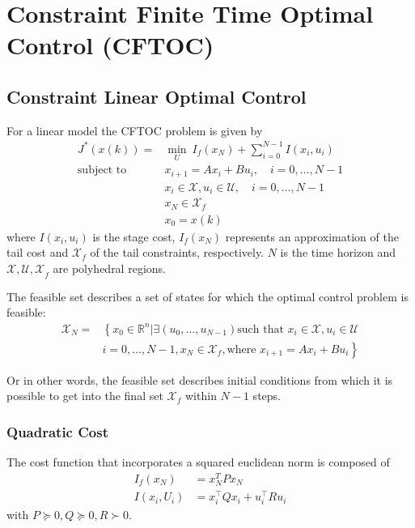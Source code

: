 \section{Constraint Finite Time Optimal Control (CFTOC)}

\subsection{Constraint Linear Optimal Control}

For a linear model the CFTOC problem is given by
\begin{align*}
    J^*(x(k)) =            & \min_U \: I_f(x_N) + \sum_{i=0}^{N-1}I(x_i,u_i)                    \\
    \text{subject to}\quad & x_{i+1} = Ax_i +Bu_i, \quad i = 0, \ldots, N-1                     \\
                           & x_i \in \mathcal{X}, u_i \in \mathcal{U}, \quad i = 0, \ldots, N-1 \\
                           & x_N \in \mathcal{X}_f                                              \\
                           & x_0 = x(k)
\end{align*}
where $I(x_i,u_i)$ is the stage cost, $I_f(x_N)$ represents an approximation of the tail cost and $\mathcal{X}_f$ of the tail constraints, respectively. $N$ is the time horizon and $\mathcal{X,U,X}_f$ are polyhedral regions.

\newpar{}

The feasible set describes a set of states for which the optimal control problem is feasible:
\begin{align*}
    \mathcal{X}_N = & \left\{ x_0 \in \mathbb{R}^n | \exists\left(u_0, \ldots, u_{N-1}\right) \text{such that } x_i\in\mathcal{X}, u_i\in\mathcal{U} \right. \\
                    & \left.i=0,\ldots, N-1, x_N\in\mathcal{X}_f, \text{where } x_{i+1}=Ax_i + Bu_i\right\}
\end{align*}

Or in other words, the feasible set describes initial conditions from which it is possible to get into the final set $\mathcal{X}_f$ within $N-1$ steps.

\subsubsection{Quadratic Cost}

The cost function that incorporates a squared euclidean norm is composed of
\begin{align*}
    I_f(x_N)   & = x_N^T P x_N                     \\
    I(x_i,U_i) & = x_i^\top Q x_i + u_i^\top R u_i
\end{align*}
with $P\succeq0, Q\succeq0, R\succ0$.

